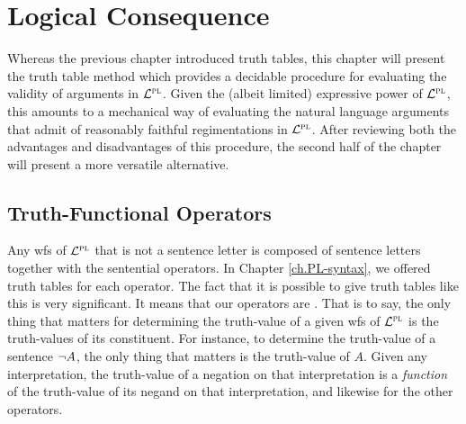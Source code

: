 \chapter{Logical Consequence}
\label{ch.PL-semantics}

Whereas the previous chapter introduced truth tables, this chapter will present the truth table method which provides a decidable procedure for evaluating the validity of arguments in $\mathcal{L}^{\textsc{pl}}$.
Given the (albeit limited) expressive power of $\mathcal{L}^{\textsc{pl}}$, this amounts to a mechanical way of evaluating the natural language arguments that admit of reasonably faithful regimentations in $\mathcal{L}^{\textsc{pl}}$.
After reviewing both the advantages and disadvantages of this procedure, the second half of the chapter will present a more versatile alternative.




\section{Truth-Functional Operators}
  \label{sec:PL-truthfuctions}

Any wfs of $\mathcal{L}^{\textsc{pl}}$ that is not a sentence letter is composed of sentence letters together with the sentential operators.
In Chapter \ref{ch.PL-syntax}, we offered truth tables for each operator.
The fact that it is possible to give truth tables like this is very significant.
It means that our operators are .
That is to say, the only thing that matters for determining the truth-value of a given wfs of $\mathcal{L}^{\textsc{pl}}$ is the truth-values of its constituent.
For instance, to determine the truth-value of a sentence $\neg A$, the only thing that matters is the truth-value of $A$.
Given any interpretation, the truth-value of a negation on that interpretation is a \textit{function} of the truth-value of its negand on that interpretation, and likewise for the other operators.

